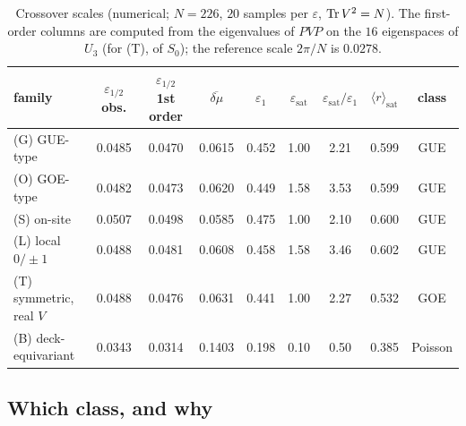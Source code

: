 \begin{table}[ht]
\centering\small
\renewcommand{\arraystretch}{1.15}
\begin{tabular}{lcccccccc}
\toprule
family & $\varepsilon_{1/2}$ obs. & $\varepsilon_{1/2}$ 1st order & $\overline{\delta\mu}$ &
$\varepsilon_1$ & $\varepsilon_{\mathrm{sat}}$ & $\varepsilon_{\mathrm{sat}}/\varepsilon_1$ &
$\langle r\rangle_{\mathrm{sat}}$ & class\\
\midrule
(G) GUE-type       & 0.0485 & 0.0470 & 0.0615 & 0.452 & 1.00 & 2.21 & 0.599 & GUE\\
(O) GOE-type       & 0.0482 & 0.0473 & 0.0620 & 0.449 & 1.58 & 3.53 & 0.599 & GUE\\
(S) on-site        & 0.0507 & 0.0498 & 0.0585 & 0.475 & 1.00 & 2.10 & 0.600 & GUE\\
(L) local $0/\pm1$ & 0.0488 & 0.0481 & 0.0608 & 0.458 & 1.58 & 3.46 & 0.602 & GUE\\
(T) symmetric, real $V$ & 0.0488 & 0.0476 & 0.0631 & 0.441 & 1.00 & 2.27 & 0.532 & GOE\\
(B) deck-equivariant & 0.0343 & 0.0314 & 0.1403 & 0.198 & 0.10 & 0.50 & 0.385 & Poisson\\
\bottomrule
\end{tabular}
\medskip
\caption{Crossover scales (numerical; $N=226$, $20$ samples per $\varepsilon$, $\operatorname{Tr} V^{2}=N$).
The first-order columns are computed from the eigenvalues of $PVP$ on the $16$ eigenspaces of
$U_3$ (for (T), of $S_0$); the reference scale $2\pi/N$ is $0.0278$.}
\label{V3P4:tab:cross}
\end{table}

\subsection*{Which class, and why}

